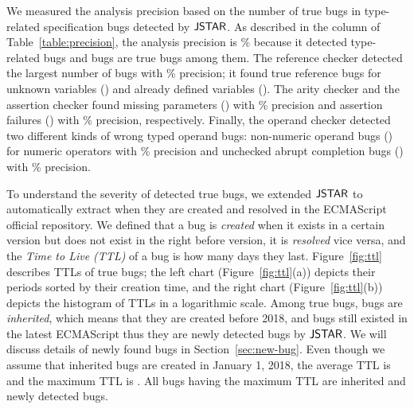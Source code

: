 We measured the analysis precision based on the number of true bugs in
type-related specification bugs detected by $\tool$.  As described in the
 column of Table~\ref{table:precision}, the analysis precision
is \% because it detected  type-related bugs and
 bugs are true bugs among them.  The reference checker detected the
largest number of bugs with \% precision; it found  true
reference bugs for  unknown variables () and
 already defined variables (). The arity
checker and the assertion checker found  missing parameters
() with \% precision and  assertion
failures () with \% precision, respectively.
Finally, the operand checker detected two different kinds of wrong typed operand
bugs:  non-numeric operand bugs () for numeric
operators with \% precision and  unchecked abrupt
completion bugs () with \% precision.

To understand the severity of detected true bugs, we extended $\tool$ to
automatically extract when they are created and resolved in the ECMAScript
official repository.  We defined that a bug is \textit{created} when it exists
in a certain version but does not exist in the right before version, it is
\textit{resolved} vice versa, and the \textit{Time to Live (TTL)} of a bug is
how many days they last.  Figure~\ref{fig:ttl} describes TTLs of true bugs; the
left chart (Figure~\ref{fig:ttl}(a)) depicts their periods sorted by their
creation time, and the right chart (Figure~\ref{fig:ttl}(b)) depicts the
histogram of TTLs in a logarithmic scale.  Among  true bugs,
 bugs are \textit{inherited}, which means that they are created before
2018, and  bugs still existed in the latest ECMAScript thus they are
newly detected bugs by $\tool$.  We will discuss details of  newly
found bugs in Section~\ref{sec:new-bug}.  Even though we assume that 
inherited bugs are created in January 1, 2018, the average TTL is 
and the maximum TTL is .  All bugs having the maximum TTL are
inherited and newly detected bugs.

